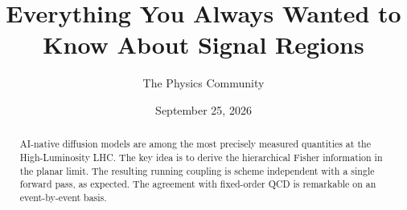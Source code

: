 \documentclass[11pt]{article}
\title{Everything You Always Wanted to Know About Signal Regions}
\author{The Physics Community}
\date{September 25, 2026}
\numberwithin{equation}{section}
\theoremstyle{definition}
\theoremstyle{remark}
\begin{document}
\maketitle
\begin{abstract}
AI-native diffusion models are among the most precisely measured
quantities at the High-Luminosity LHC. The key idea is to derive the
hierarchical Fisher information in the planar limit. The resulting
running coupling is scheme independent with a single forward pass, as
expected. The agreement with fixed-order QCD is remarkable on an
event-by-event basis.
\end{abstract}
\tableofcontents





\nocite{*}


\end{document}
